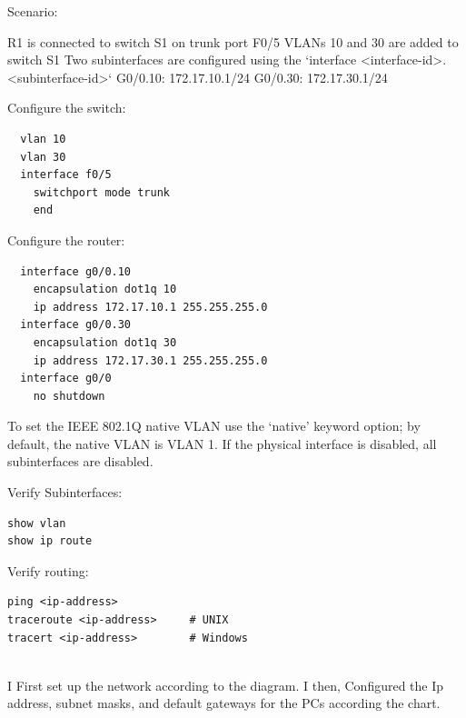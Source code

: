 \documentclass[../EngineeringJournal_CDavis.tex]{subfiles}
\begin{document}
\hspace{0.2cm}
\begin{tcolorbox}[width=6.3in]
  Scenario:
\scriptsize
\begin{outline}
  \1 R1 is connected to switch S1 on trunk port F0/5
  \1 VLANs 10 and 30 are added to switch S1
  \1 Two subinterfaces are configured 
    \2 using the `interface <interface-id>.<subinterface-id>` 
    \2 G0/0.10: 172.17.10.1/24 \- G0/0.30: 172.17.30.1/24
\end{outline}
\normalsize
  Configure the switch:
\scriptsize
\begin{verbatim}
  vlan 10
  vlan 30
  interface f0/5
    switchport mode trunk
    end
\end{verbatim}
\normalsize
  Configure the router:
\scriptsize
\begin{verbatim}
  interface g0/0.10
    encapsulation dot1q 10
    ip address 172.17.10.1 255.255.255.0
  interface g0/0.30
    encapsulation dot1q 30
    ip address 172.17.30.1 255.255.255.0
  interface g0/0
    no shutdown
\end{verbatim}
\begin{outline}
  \1 To set the IEEE 802.1Q native VLAN
    \2 use the `native' keyword option;
    \2 by default, the native VLAN is VLAN 1.
  \1 If the physical interface is disabled, 
    \2 all subinterfaces are disabled.
\end{outline}
\normalsize
Verify Subinterfaces:
\scriptsize
\begin{verbatim}
show vlan
show ip route
\end{verbatim}
\normalsize
  Verify routing:
\scriptsize
\begin{verbatim}
ping <ip-address>
traceroute <ip-address>		# UNIX
tracert <ip-address>		# Windows
\end{verbatim}
\end{tcolorbox}
\hspace{0.2cm}
\normalsize  
  
\clearpage


\\
I First set up the network according to the diagram.
I then, Configured the Ip address, subnet masks, and default gateways for the
PCs according the chart.
\end{document}
